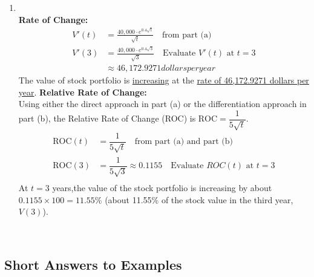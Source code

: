 \begin{example}
\begin{solL}
\begin{enumerate}[leftmargin=*]
\item \hfill \\
\newline
\textbf{Rate of Change:}\\
\begin{displaymath}
    \begin{split}
        V'(t)&=\frac{40,000\cdot e^{0.4\sqrt{t}}}{\sqrt{t}}\quad \text{from part (a)}\\
        V'(3)&=\frac{40,000\cdot e^{0.4\sqrt{3}}}{\sqrt{3}} \quad \text{Evaluate $V'(t)$ at $t=3$}\\
        &\approx 46,172.9271 dollars per year
    \end{split}
\end{displaymath}
The value of stock portfolio is \underline{increasing} at the \underline{rate of 46,172.9271 dollars per year}.
\flushleft\textbf{Relative Rate of Change:}\\
Using either the direct approach in part (a) or the differentiation approach in part (b), the Relative Rate of Change (ROC) is $\text{ROC}=\dfrac{1}{5\sqrt{t}}$.\\
\begin{displaymath}
    \begin{split}
        \text{ROC}(t)&=\dfrac{1}{5\sqrt{t}}\quad \text{from part (a) and part (b)}\\
        \text{ROC}(3)&=\dfrac{1}{5\sqrt{3}}\approx 0.1155  \quad \text{Evaluate $ROC(t)$ at $t=3$}\\
    \end{split}
\end{displaymath}
At $t=3$ years,the value of the stock portfolio is increasing by about $0.1155\times 100=11.55$\% (about 11.55\% of the stock value in the third year, $V(3)$).
\end{enumerate}
\end{solL}
    
\end{example}
\




\vspace*{\fill}

\subsection*{Short Answers to Examples}

%


